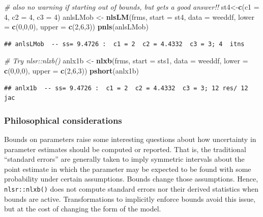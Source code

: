 \documentclass[
]{article}
\newenvironment{Shaded}{\begin{snugshade}}{\end{snugshade}}
\newcommand{\AttributeTok}[1]{\textcolor[rgb]{0.13,0.29,0.53}{#1}}
\newcommand{\CommentTok}[1]{\textcolor[rgb]{0.56,0.35,0.01}{\textit{#1}}}
\newcommand{\DecValTok}[1]{\textcolor[rgb]{0.00,0.00,0.81}{#1}}
\newcommand{\FunctionTok}[1]{\textcolor[rgb]{0.13,0.29,0.53}{\textbf{#1}}}
\newcommand{\NormalTok}[1]{#1}
\newcommand{\OtherTok}[1]{\textcolor[rgb]{0.56,0.35,0.01}{#1}}
\begin{document}
\begin{Shaded}
\begin{Highlighting}[]
\CommentTok{\# also no warning if starting out of bounds, but gets a good answer!!}
\NormalTok{st4}\OtherTok{\textless{}{-}}\FunctionTok{c}\NormalTok{(}\AttributeTok{c1 =} \DecValTok{4}\NormalTok{, }\AttributeTok{c2 =} \DecValTok{4}\NormalTok{, }\AttributeTok{c3 =} \DecValTok{4}\NormalTok{)}
\NormalTok{anlsLMob }\OtherTok{\textless{}{-}} \FunctionTok{nlsLM}\NormalTok{(frms, }\AttributeTok{start =}\NormalTok{ st4, }\AttributeTok{data =}\NormalTok{ weeddf, }\AttributeTok{lower =} \FunctionTok{c}\NormalTok{(}\DecValTok{0}\NormalTok{,}\DecValTok{0}\NormalTok{,}\DecValTok{0}\NormalTok{), }\AttributeTok{upper =} \FunctionTok{c}\NormalTok{(}\DecValTok{2}\NormalTok{,}\DecValTok{6}\NormalTok{,}\DecValTok{3}\NormalTok{))}
\FunctionTok{pnls}\NormalTok{(anlsLMob)}
\end{Highlighting}
\end{Shaded}

\begin{verbatim}
## anlsLMob  -- ss= 9.4726 :  c1 = 2  c2 = 4.4332  c3 = 3; 4  itns
\end{verbatim}

\begin{Shaded}
\begin{Highlighting}[]
\CommentTok{\# Try nlsr::nlxb()}
\NormalTok{anlx1b }\OtherTok{\textless{}{-}} \FunctionTok{nlxb}\NormalTok{(frms, }\AttributeTok{start =}\NormalTok{ sts1, }\AttributeTok{data =}\NormalTok{ weeddf, }\AttributeTok{lower =} \FunctionTok{c}\NormalTok{(}\DecValTok{0}\NormalTok{,}\DecValTok{0}\NormalTok{,}\DecValTok{0}\NormalTok{), }\AttributeTok{upper =} \FunctionTok{c}\NormalTok{(}\DecValTok{2}\NormalTok{,}\DecValTok{6}\NormalTok{,}\DecValTok{3}\NormalTok{))}
\FunctionTok{pshort}\NormalTok{(anlx1b)}
\end{Highlighting}
\end{Shaded}

\begin{verbatim}
## anlx1b  -- ss= 9.4726 :  c1 = 2  c2 = 4.4332  c3 = 3; 12 res/ 12 jac
\end{verbatim}

\hypertarget{philosophical-considerations}{%
\subsubsection{Philosophical
considerations}\label{philosophical-considerations}}

Bounds on parameters raise some interesting questions about how
uncertainty in parameter estimates should be computed or reported. That
is, the traditional ``standard errors'' are generally taken to imply
symmetric intervals about the point estimate in which the parameter may
be expected to be found with some probability under certain assumptions.
Bounds change those assumptions. Hence, \texttt{nlsr::nlxb()} does not
compute standard errors nor their derived statistics when bounds are
active. Transformations to implicitly enforce bounds avoid this issue,
but at the cost of changing the form of the model.
\end{document}
